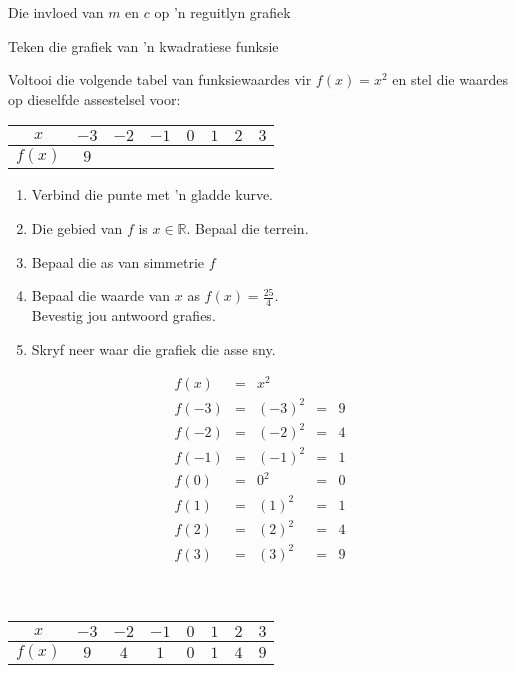 \begin{Ondersoek}{Die invloed van $m$ en $c$ op 'n reguitlyn grafiek}
\begin{wex}{Teken die grafiek van 'n kwadratiese funksie}
{Voltooi die volgende tabel van funksiewaardes vir $f(x)=x^{2}$ en stel die waardes op dieselfde assestelsel voor:
\\
\begin{center}
\begin{tabular}{|c|c|c|c|c|c|c|c|}
\hline
  $x$ &  $-3$ & $-2$ & $-1$ & $0$ & $1$ & $2$ & $3$
\\ \hline
 $f(x)$& $9$ &&&&&&
\\ \hline
\end{tabular}
\end{center}
\vspace{10pt}
\begin{enumerate}[noitemsep, label=\textbf{\arabic*}. ] 
 \item Verbind die punte met 'n gladde kurve.
\item Die gebied van $f$ is $x \in \mathbb{R}$. Bepaal die terrein.
\item Bepaal die as van simmetrie $f$
\item Bepaal die waarde van $x$ as $f(x) = \frac{25}{4}$. \\Bevestig jou antwoord grafies.
\item Skryf neer waar die grafiek die asse sny.
\end{enumerate}
}
{
\begin{equation*}
 \begin{array}{cclcc}
  f(x) &=& x^{2} & &\\
 f(-3) &=& (-3)^{2} &=& 9 \\ 
 f(-2) &=& (-2)^{2} &=& 4 \\
 f(-1) &=& (-1)^{2} &=& 1 \\
f(0) &=& 0^{2} &= &0 \\
f(1) &=& (1)^{2} &= &1 \\ 
f(2) &=& (2)^{2} &= &4 \\
f(3) &=& (3)^{2} &= &9
 \end{array}
\end{equation*}
\\
\\
\begin{center}
\begin{tabular}{|c|c|c|c|c|c|c|c|}
\hline
  $x$ &  $-3$ & $-2$ & $-1$ & $0$ & $1$ & $2$ & $3$
\\ \hline
 $f(x)$& $9$ &$4$&$1$&$0$&$1$&$4$&$9$
\\ \hline
\end{tabular}
\end{center}

}
\end{wex}
\end{Ondersoek}
